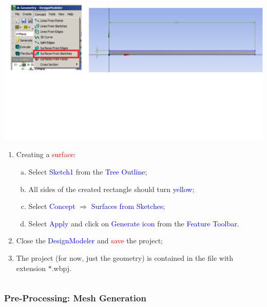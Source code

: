 \documentclass[10pt,compress, unknownkeysallowed]{beamer}
\newcommand{\red}{\textcolor{red}}
\newcommand{\blue}{\textcolor{blue}}
\begin{document}
\begin{frame}
\begin{columns}
\begin{column}[l]{0.5\linewidth}
{\begin{center}
                \includegraphics[width=\columnwidth, clip]{./Figs/Geometry4b.pdf} 
          \end{center}}
          \begin{enumerate}\scriptsize\setcounter{enumi}{6}
             \item<2-> Creating a \red{surface}:
                 \begin{enumerate}[a)]\scriptsize
                    \item<2-> Select \blue{Sketch1} from the \blue{Tree Outline};
                    \item<2-> All sides of the created rectangle should turn \blue{yellow};
                    \item<2-> Select \blue{Concept} $\Rightarrow$ \blue{Surfaces from Sketches};
                    \item<2-> Select \blue{Apply} and click on \blue{Generate icon} from the \blue{Feature Toolbar}.
                 \end{enumerate}
             \item<3-> Close the \blue{DesignModeler} and \red{save} the project;
             \item<3-> The project (for now, just the geometry) is contained in the file with extension $\ast$.wbpj.
          \end{enumerate}
       \end{column}
    \end{columns}
\end{frame} 

 
\subsubsection{Pre-Processing: Mesh Generation}
\end{document}

